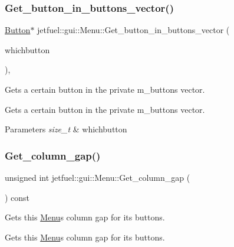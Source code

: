 \subsubsection{\texorpdfstring{Get\+\_\+button\+\_\+in\+\_\+buttons\+\_\+vector()}{Get\_button\_in\_buttons\_vector()}}
{\footnotesize\ttfamily \hyperlink{classjetfuel_1_1gui_1_1Button}{Button}$\ast$ jetfuel\+::gui\+::\+Menu\+::\+Get\+\_\+button\+\_\+in\+\_\+buttons\+\_\+vector (\begin{DoxyParamCaption}\item[{const size\+\_\+t}]{whichbutton }\end{DoxyParamCaption})\hspace{0.3cm}{\ttfamily [inline]}, {\ttfamily [protected]}}



Gets a certain button in the private m\+\_\+buttons vector. 

Gets a certain button in the private m\+\_\+buttons vector.


\begin{DoxyParams}{Parameters}
{\em size\+\_\+t} & whichbutton \\
\hline
\end{DoxyParams}
\mbox{\label{classjetfuel_1_1gui_1_1Menu_a52a091ea0c745c1e09752a1766a8f262}} 
\subsubsection{\texorpdfstring{Get\+\_\+column\+\_\+gap()}{Get\_column\_gap()}}
{\footnotesize\ttfamily unsigned int jetfuel\+::gui\+::\+Menu\+::\+Get\+\_\+column\+\_\+gap (\begin{DoxyParamCaption}{ }\end{DoxyParamCaption}) const\hspace{0.3cm}{\ttfamily [inline]}}



Gets this \hyperlink{classjetfuel_1_1gui_1_1Menu}{Menu}\textquotesingle{}s column gap for it\textquotesingle{}s buttons. 

Gets this \hyperlink{classjetfuel_1_1gui_1_1Menu}{Menu}\textquotesingle{}s column gap for it\textquotesingle{}s buttons. \mbox{\label{classjetfuel_1_1gui_1_1Menu_aa8dbb384542c547ff90cdfeea1ff07eb}} 
